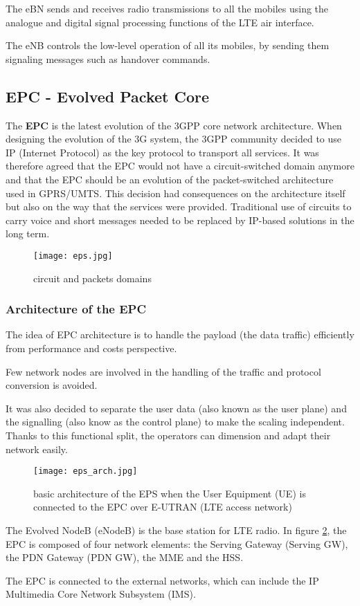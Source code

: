 The eBN sends and receives radio transmissions to all the mobiles using the
analogue and digital signal processing functions of the LTE air interface.

The eNB controls the low-level operation of all its mobiles, by sending them
signaling messages such as handover commands.

\subsection{EPC - Evolved Packet Core}

The \textbf{EPC} is the latest evolution of the 3GPP core network architecture.
When designing the evolution of the 3G system, the 3GPP community decided to
use IP (Internet Protocol) as the key protocol to transport all services.
It was therefore agreed that the EPC would not have a circuit-switched domain
anymore and that the EPC should be an evolution of the packet-switched
architecture used in GPRS/UMTS.
This decision had consequences on the architecture itself but also on the way
that the services were provided.
Traditional use of circuits to carry voice and short messages needed to be
replaced by IP-based solutions in the long term.

\begin{figure}[H]
  \centering
  \texttt{[image: eps.jpg]}
  \caption{circuit and packets domains}
  \label{fig:eps}
\end{figure}

\subsubsection{Architecture of the EPC}

The idea of EPC architecture is to handle the payload (the data traffic)
efficiently from performance and costs perspective.

Few network nodes are involved in the handling of the traffic and protocol
conversion is avoided.

It was also decided to separate the user data (also known as the user plane)
and the signalling (also know as the control plane) to make the scaling
independent.
Thanks to this functional split, the operators can dimension and adapt their
network easily.

\begin{figure}[H]
  \centering
  \texttt{[image: eps\_arch.jpg]}
  \caption{basic architecture of the EPS when the User Equipment
(UE) is connected to the EPC over E-UTRAN (LTE access network)}
  \label{fig:eps_arch}
\end{figure}

The Evolved NodeB (eNodeB) is the base station for LTE radio.
In figure \ref{fig:eps_arch}, the EPC is composed of four network elements:
the Serving Gateway (Serving GW), the PDN Gateway (PDN GW), the MME and
the HSS.

The EPC is connected to the external networks, which can include the IP
Multimedia Core Network Subsystem (IMS).
